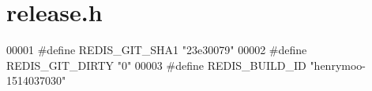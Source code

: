 \hypertarget{release_8h_source}{}\section{release.\+h}
\label{release_8h_source}

\begin{DoxyCode}
00001 \textcolor{preprocessor}{#}\textcolor{preprocessor}{define} \textcolor{preprocessor}{REDIS\_GIT\_SHA1} \textcolor{stringliteral}{"23e30079"}
00002 \textcolor{preprocessor}{#}\textcolor{preprocessor}{define} \textcolor{preprocessor}{REDIS\_GIT\_DIRTY} \textcolor{stringliteral}{"0"}
00003 \textcolor{preprocessor}{#}\textcolor{preprocessor}{define} \textcolor{preprocessor}{REDIS\_BUILD\_ID} \textcolor{stringliteral}{"henrymoo-1514037030"}
\end{DoxyCode}
